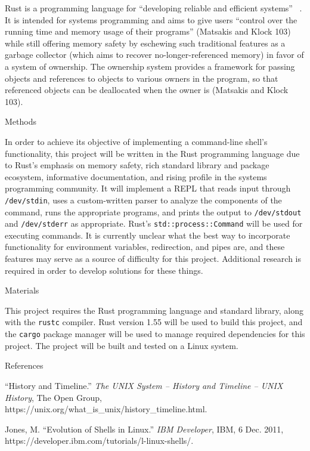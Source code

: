 \documentclass[12pt]{article}
\newcommand{\bibent}{\noindent \hangindent 40pt}
\newenvironment{workscited}{}{\newpage }
\begin{document}
\begin{flushleft}
			Rust is a programming language for “developing reliable and efficient systems” ~\cite{rust}. It is intended for systems programming and aims to give users “control over the running time and memory usage of their programs” (Matsakis and Klock 103) while still offering memory safety by eschewing such traditional features as a garbage collector (which aims to recover no-longer-referenced memory) in favor of a system of ownership. The ownership system provides a framework for passing objects and references to objects to various owners in the program, so that referenced objects can be deallocated when the owner is (Matsakis and Klock 103).

			{\large Methods\par}
			In order to achieve its objective of implementing a command-line shell’s functionality, this project will be written in the Rust programming language due to Rust’s emphasis on memory safety, rich standard library and package ecosystem, informative documentation, and rising profile in the systems programming community. It will implement a REPL that reads input through \verb|/dev/stdin|, uses a custom-written parser to analyze the components of the command, runs the appropriate programs, and prints the output to \verb|/dev/stdout| and \verb|/dev/stderr| as appropriate. Rust’s \verb|std::process::Command| will be used for executing commands. It is currently unclear what the best way to incorporate functionality for environment variables, redirection, and pipes are, and these features may serve as a source of difficulty for this project. Additional research is required in order to develop solutions for these things.

			{\large Materials\par}
			This project requires the Rust programming language and standard library, along with the \verb|rustc| compiler. Rust version 1.55 will be used to build this project, and the \verb|cargo| package manager will be used to manage required dependencies for this project. The project will be built and tested on a Linux system.

			{\large References\par}
			\begin{workscited}

				\bibent
				“History and Timeline.” \textit{The UNIX System -- History and Timeline -- UNIX History}, The Open
				Group, https://unix.org/what\_is\_unix/history\_timeline.html.

				\bibent
				Jones, M. “Evolution of Shells in Linux.” \textit{IBM Developer}, IBM, 6 Dec. 2011,
				https://developer.ibm.com/tutorials/l-linux-shells/.


\end{workscited}
\end{flushleft}
\end{document}
